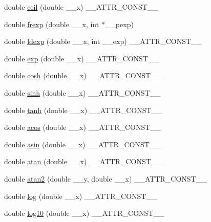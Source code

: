 \begin{DoxyCompactItemize}
\item 
double \hyperlink{group__avr__math_gaf3602dd198f88f5a571f62936fd6b5cc}{ceil} (double \+\_\+\+\_\+x) \+\_\+\+\_\+\+A\+T\+T\+R\+\_\+\+C\+O\+N\+S\+T\+\_\+\+\_\+
\item 
double \hyperlink{group__avr__math_ga89f0cb053e3cdb0c9c952ef040087c80}{frexp} (double \+\_\+\+\_\+x, int $\ast$\+\_\+\+\_\+pexp)
\item 
double \hyperlink{group__avr__math_ga71765b713504b7c380b1720e0ac909cc}{ldexp} (double \+\_\+\+\_\+x, int \+\_\+\+\_\+exp) \+\_\+\+\_\+\+A\+T\+T\+R\+\_\+\+C\+O\+N\+S\+T\+\_\+\+\_\+
\item 
double \hyperlink{group__avr__math_gab7e32d20a0c6089375c9a088e819d1fb}{exp} (double \+\_\+\+\_\+x) \+\_\+\+\_\+\+A\+T\+T\+R\+\_\+\+C\+O\+N\+S\+T\+\_\+\+\_\+
\item 
double \hyperlink{group__avr__math_ga9b61c968b8ce23a16b64b4e10cdb9970}{cosh} (double \+\_\+\+\_\+x) \+\_\+\+\_\+\+A\+T\+T\+R\+\_\+\+C\+O\+N\+S\+T\+\_\+\+\_\+
\item 
double \hyperlink{group__avr__math_ga00265cea3ae92c52d2aa9cc32f2e6557}{sinh} (double \+\_\+\+\_\+x) \+\_\+\+\_\+\+A\+T\+T\+R\+\_\+\+C\+O\+N\+S\+T\+\_\+\+\_\+
\item 
double \hyperlink{group__avr__math_ga97f0f3ecd653766bd1a94910cb0cad9f}{tanh} (double \+\_\+\+\_\+x) \+\_\+\+\_\+\+A\+T\+T\+R\+\_\+\+C\+O\+N\+S\+T\+\_\+\+\_\+
\item 
double \hyperlink{group__avr__math_gaa3a144378cb5470be25699ce14b5998b}{acos} (double \+\_\+\+\_\+x) \+\_\+\+\_\+\+A\+T\+T\+R\+\_\+\+C\+O\+N\+S\+T\+\_\+\+\_\+
\item 
double \hyperlink{group__avr__math_ga3d13e59a7e1b64fc5427ed1164356866}{asin} (double \+\_\+\+\_\+x) \+\_\+\+\_\+\+A\+T\+T\+R\+\_\+\+C\+O\+N\+S\+T\+\_\+\+\_\+
\item 
double \hyperlink{group__avr__math_ga91781e24e088dac3595e3fee50fcfb6d}{atan} (double \+\_\+\+\_\+x) \+\_\+\+\_\+\+A\+T\+T\+R\+\_\+\+C\+O\+N\+S\+T\+\_\+\+\_\+
\item 
double \hyperlink{group__avr__math_ga1282adc3f67ff1b7ed9bdeef3e7b1ab6}{atan2} (double \+\_\+\+\_\+y, double \+\_\+\+\_\+x) \+\_\+\+\_\+\+A\+T\+T\+R\+\_\+\+C\+O\+N\+S\+T\+\_\+\+\_\+
\item 
double \hyperlink{group__avr__math_ga54ae98f13814deb08e40335a339b6efe}{log} (double \+\_\+\+\_\+x) \+\_\+\+\_\+\+A\+T\+T\+R\+\_\+\+C\+O\+N\+S\+T\+\_\+\+\_\+
\item 
double \hyperlink{group__avr__math_ga89c64ad3ffb4900c806fb6827c30ed1d}{log10} (double \+\_\+\+\_\+x) \+\_\+\+\_\+\+A\+T\+T\+R\+\_\+\+C\+O\+N\+S\+T\+\_\+\+\_\+

\end{DoxyCompactItemize}
